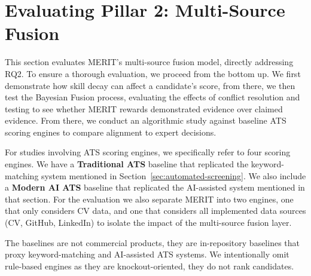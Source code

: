 \section{Evaluating Pillar 2: Multi-Source Fusion}
\label{sec:evaluating-multi-source-fusion}

\newcommand{\splithead}[2]{\begin{tabular}[c]{@{}c@{}}\textbf{#1} \\ \textbf{#2}\end{tabular}}
\newcommand{\splitcand}[2]{\begin{tabular}[c]{@{}l@{}}#1 \\ #2\end{tabular}}
\newcommand{\splitdesc}[2]{\begin{tabular}[c]{@{}l@{}}#1 \\ #2\end{tabular}}
\newcommand{\splitcell}[2]{\begin{tabular}[c]{@{}c@{}}\##1 \\ (#2)\end{tabular}}
\newcommand{\rankonly}[1]{\##1}

This section evaluates MERIT's multi-source fusion model, directly addressing RQ2. To ensure a thorough
evaluation, we proceed from the bottom up. We first demonstrate how skill decay can affect a candidate's score, 
from there, we then test the Bayesian Fusion process, evaluating the effects of conflict resolution and 
testing to see whether MERIT rewards demonstrated evidence over claimed evidence. From there, we conduct
an algorithmic study against baseline ATS scoring engines to compare alignment to expert decisions.

For studies involving ATS scoring engines, we specifically refer to four scoring engines. We have a \textbf{Traditional ATS}
baseline that replicated the keyword-matching system mentioned in Section~\ref{sec:automated-screening}. We also include a 
\textbf{Modern AI ATS} baseline that replicated the AI-assisted system mentioned in that section. For the evaluation
we also separate MERIT into two engines, one that only considers CV data, and one that considers all implemented
data sources (CV, GitHub, LinkedIn) to isolate the impact of the multi-source fusion layer.

The baselines are not commercial products, they are in-repository baselines that proxy keyword-matching and AI-assisted 
ATS systems. We intentionally omit rule-based engines as they are knockout-oriented, they do not rank candidates. 

